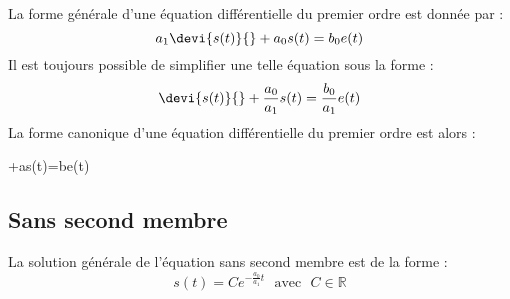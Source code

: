 La forme générale d'une équation différentielle du premier ordre est
donnée par : 
$$
a_1\devi{s(t)}{}+a_0s(t)=b_0e(t)
$$
Il est toujours possible de simplifier une telle équation sous la forme :
$$
\devi{s(t)}{}+\dfrac{a_0}{a_1}s(t)=\dfrac{b_0}{a_1}e(t)
$$
La forme canonique d'une équation différentielle du premier ordre est alors :
\begin{bequation}
+as(t)=be(t)
\end{bequation}


\subsection{Sans second membre}

La solution générale de l'équation sans second membre est de la forme :
$$
s(t) = C e^{-\frac{a_0}{a_1}t}\,\,\,\,\text{avec}\,\,\,\,C\in\mathbb{R}
$$


